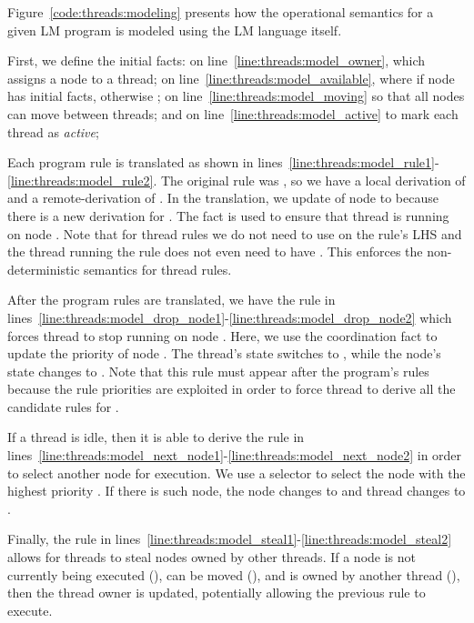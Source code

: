 Figure~\ref{code:threads:modeling} presents how the operational semantics for a
given LM program is modeled using the LM language itself.

First, we define the initial facts:  on
line~\ref{line:threads:model_owner}, which assigns a node to a thread;
 on line~\ref{line:threads:model_available}, where
 if node  has initial facts, otherwise ;
 on line~\ref{line:threads:model_moving} so that all nodes
can move between threads; and  on
line~\ref{line:threads:model_active} to mark each thread as \emph{active};

Each program rule is translated as shown in
lines~\ref{line:threads:model_rule1}-\ref{line:threads:model_rule2}. The
original rule was , so we have a local derivation of  and a
remote-derivation of . In the translation, we update
 of node  to  because there is a new
derivation for . The fact  is used to ensure that
thread  is running on node . Note that for thread rules we do
not need to use  on the rule's LHS and the thread running
the rule does not even need to have . This enforces the
non-deterministic semantics for thread rules.

After the program rules are translated, we have the rule in
lines~\ref{line:threads:model_drop_node1}-\ref{line:threads:model_drop_node2}
which forces thread  to stop running on node . Here, we use the
coordination fact  to update the priority of node
. The thread's state switches to , while the node's state
changes to . Note that this rule must appear after the
program's rules because the rule priorities are exploited in order to force
thread  to derive all the candidate rules for .

If a thread is idle, then it is able to derive the rule in
lines~\ref{line:threads:model_next_node1}-\ref{line:threads:model_next_node2} in
order to select another node for execution. We use a  selector to
select the node  with the highest priority . If there is such
node, the node changes to  and thread  changes to
.

Finally, the rule in
lines~\ref{line:threads:model_steal1}-\ref{line:threads:model_steal2} allows for
threads to steal nodes owned by other threads. If a node is not currently being
executed (), can be moved (), and is owned by
another thread  (), then the thread owner is
updated, potentially allowing the previous rule to execute.

